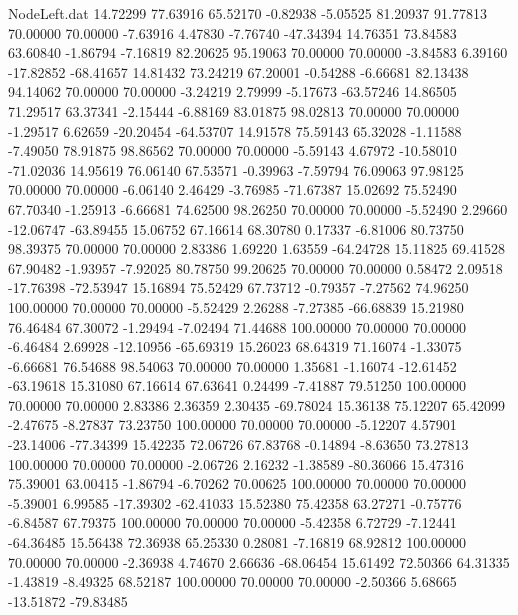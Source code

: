 \begin{filecontents}{NodeLeft.dat}
  14.72299   77.63916   65.52170    -0.82938   -5.05525   81.20937   91.77813   70.00000   70.00000   -7.63916    4.47830   -7.76740  -47.34394
  14.76351   73.84583   63.60840    -1.86794   -7.16819   82.20625   95.19063   70.00000   70.00000   -3.84583    6.39160  -17.82852  -68.41657
  14.81432   73.24219   67.20001    -0.54288   -6.66681   82.13438   94.14062   70.00000   70.00000   -3.24219    2.79999   -5.17673  -63.57246
  14.86505   71.29517   63.37341    -2.15444   -6.88169   83.01875   98.02813   70.00000   70.00000   -1.29517    6.62659  -20.20454  -64.53707
  14.91578   75.59143   65.32028    -1.11588   -7.49050   78.91875   98.86562   70.00000   70.00000   -5.59143    4.67972  -10.58010  -71.02036
  14.95619   76.06140   67.53571    -0.39963   -7.59794   76.09063   97.98125   70.00000   70.00000   -6.06140    2.46429   -3.76985  -71.67387
  15.02692   75.52490   67.70340    -1.25913   -6.66681   74.62500   98.26250   70.00000   70.00000   -5.52490    2.29660  -12.06747  -63.89455
  15.06752   67.16614   68.30780     0.17337   -6.81006   80.73750   98.39375   70.00000   70.00000    2.83386    1.69220    1.63559  -64.24728
  15.11825   69.41528   67.90482    -1.93957   -7.92025   80.78750   99.20625   70.00000   70.00000    0.58472    2.09518  -17.76398  -72.53947
  15.16894   75.52429   67.73712    -0.79357   -7.27562   74.96250  100.00000   70.00000   70.00000   -5.52429    2.26288   -7.27385  -66.68839
  15.21980   76.46484   67.30072    -1.29494   -7.02494   71.44688  100.00000   70.00000   70.00000   -6.46484    2.69928  -12.10956  -65.69319
  15.26023   68.64319   71.16074    -1.33075   -6.66681   76.54688   98.54063   70.00000   70.00000    1.35681   -1.16074  -12.61452  -63.19618
  15.31080   67.16614   67.63641     0.24499   -7.41887   79.51250  100.00000   70.00000   70.00000    2.83386    2.36359    2.30435  -69.78024
  15.36138   75.12207   65.42099    -2.47675   -8.27837   73.23750  100.00000   70.00000   70.00000   -5.12207    4.57901  -23.14006  -77.34399
  15.42235   72.06726   67.83768    -0.14894   -8.63650   73.27813  100.00000   70.00000   70.00000   -2.06726    2.16232   -1.38589  -80.36066
  15.47316   75.39001   63.00415    -1.86794   -6.70262   70.00625  100.00000   70.00000   70.00000   -5.39001    6.99585  -17.39302  -62.41033
  15.52380   75.42358   63.27271    -0.75776   -6.84587   67.79375  100.00000   70.00000   70.00000   -5.42358    6.72729   -7.12441  -64.36485
  15.56438   72.36938   65.25330     0.28081   -7.16819   68.92812  100.00000   70.00000   70.00000   -2.36938    4.74670    2.66636  -68.06454
  15.61492   72.50366   64.31335    -1.43819   -8.49325   68.52187  100.00000   70.00000   70.00000   -2.50366    5.68665  -13.51872  -79.83485

\end{filecontents}
